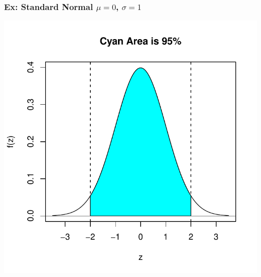 \documentclass[handout]{beamer}
\begin{document}
\begin{frame}
\frametitle{Ex: Standard Normal $\mu=0$, $\sigma=1$}
\begin{center}
\includegraphics{figure/lec07-002}
\end{center}
\end{frame}
\end{document}
